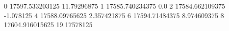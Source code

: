 0 17597.533203125 11.79296875
1 17585.740234375 0.0
2 17584.662109375 -1.078125
4 17588.09765625 2.357421875
6 17594.71484375 8.974609375
8 17604.916015625 19.17578125
